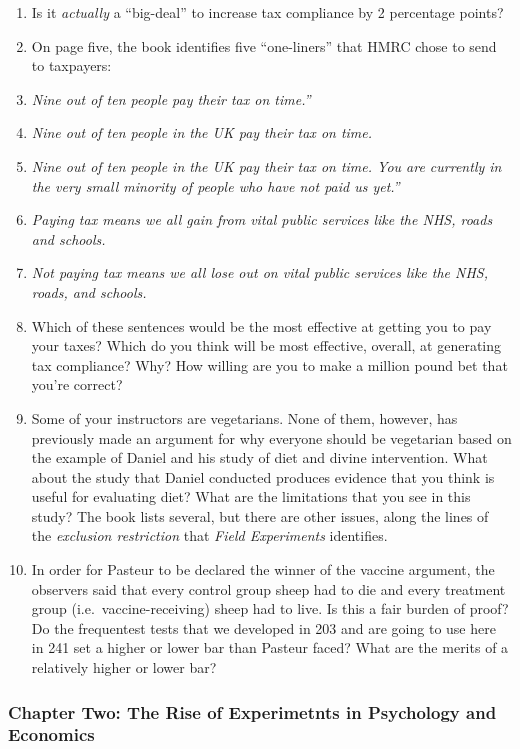 \documentclass[
]{article}
\providecommand{\tightlist}{%
  \setlength{\itemsep}{0pt}\setlength{\parskip}{0pt}}
\theoremstyle{definition}
\theoremstyle{definition}
\theoremstyle{definition}
\theoremstyle{definition}
\theoremstyle{remark}
\begin{document}
\begin{enumerate}
\def\labelenumi{\arabic{enumi}.}
\tightlist
\item
  Is it \emph{actually} a ``big-deal'' to increase tax compliance by 2 percentage points?
\item
  On page five, the book identifies five ``one-liners'' that HMRC chose to send to taxpayers:
\item
  \emph{Nine out of ten people pay their tax on time.''}
\item
  \emph{Nine out of ten people in the UK pay their tax on time.}
\item
  \emph{Nine out of ten people in the UK pay their tax on time. You are currently in the very small minority of people who have not paid us yet.''}
\item
  \emph{Paying tax means we all gain from vital public services like the NHS, roads and schools.}
\item
  \emph{Not paying tax means we all lose out on vital public services like the NHS, roads, and schools.}
\item
  Which of these sentences would be the most effective at getting you to pay your taxes? Which do you think will be most effective, overall, at generating tax compliance? Why? How willing are you to make a million pound bet that you're correct?
\item
  Some of your instructors are vegetarians. None of them, however, has previously made an argument for why everyone should be vegetarian based on the example of Daniel and his study of diet and divine intervention. What about the study that Daniel conducted produces evidence that you think is useful for evaluating diet? What are the limitations that you see in this study? The book lists several, but there are other issues, along the lines of the \emph{exclusion restriction} that \emph{Field Experiments} identifies.
\item
  In order for Pasteur to be declared the winner of the vaccine argument, the observers said that every control group sheep had to die and every treatment group (i.e.~vaccine-receiving) sheep had to live. Is this a fair burden of proof? Do the frequentest tests that we developed in 203 and are going to use here in 241 set a higher or lower bar than Pasteur faced? What are the merits of a relatively higher or lower bar?
\end{enumerate}

\subsubsection{Chapter Two: The Rise of Experimetnts in Psychology and Economics}\label{chapter-two-the-rise-of-experimetnts-in-psychology-and-economics}
\end{document}
